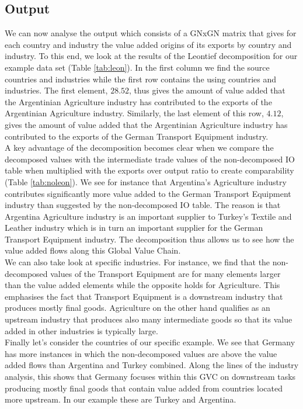 \documentclass{article}
\begin{document}
\subsection{Output}
We can now analyse the output which consists of a GNxGN matrix that gives for each country and industry the value added origins of its exports by country and industry. To this end, we look at the results of the Leontief decomposition for our example data set (Table \ref{tab:leon}). In the first column we find the source countries and industries while the first row contains the using countries and industries. The first element, \(28.52\), thus gives the amount of value added that the Argentinian Agriculture industry has contributed to the exports of the Argentinian Agriculture industry. Similarly, the last element of this row, \(4.12\), gives the amount of value added that the Argentinian Agriculture industry has contributed to the exports of the German Transport Equipment industry. \\

A key advantage of the decomposition becomes clear when we compare the decomposed values with the intermediate trade values of the non-decomposed IO table when multiplied with the exports over output ratio to create comparability (Table \ref{tab:noleon}). We see for instance that Argentina's Agriculture industry contributes significantly more value added to the German Transport Equipment industry than suggested by the non-decomposed IO table. The reason is that Argentina Agriculture industry is an important supplier to Turkey's Textile and Leather industry which is in turn an important supplier for the German Transport Equipment industry. The decomposition thus allows us to see how the value added flows along this Global Value Chain.\\
We can also take look at specific industries. For instance, we find that the non-decomposed values of the Transport Equipment are for many elements larger than the value added elements while the opposite holds for Agriculture. This emphasises the fact that Transport Equipment is a downstream industry that produces mostly final goods. Agriculture on the other hand qualifies as an upstream industry that produces also many intermediate goods so that its value added in other industries is typically large.\\

Finally let's consider the countries of our specific example. We see that Germany has more instances in which the non-decomposed values are above the value added flows than Argentina and Turkey combined. Along the lines of the industry analysis, this shows that Germany focuses within this GVC on downstream tasks producing mostly final goods that contain value added from countries located more upstream. In our example these are Turkey and Argentina.
\end{document}
